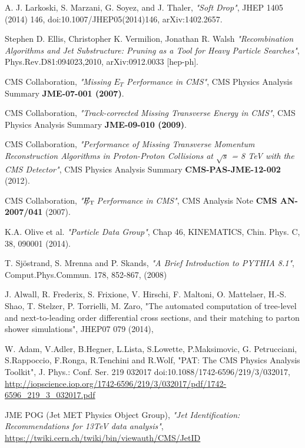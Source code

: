\documentclass[a4paper,12pt,oneside]{report}
\begin{document}
\begin{thebibliography}{9}
A. J. Larkoski, S. Marzani, G. Soyez, and J. Thaler,
\emph{"Soft Drop"},
JHEP 1405 (2014) 146, doi:10.1007/JHEP05(2014)146, arXiv:1402.2657.

Stephen D. Ellis, Christopher K. Vermilion, Jonathan R. Walsh
\emph{"Recombination Algorithms and Jet Substructure: Pruning as a Tool for Heavy Particle Searches"},
Phys.Rev.D81:094023,2010, arXiv:0912.0033 [hep-ph].

CMS Collaboration,
\emph{"Missing $E_{T}$ Performance in CMS"},
CMS Physics Analysis Summary 
\textbf{JME-07-001 (2007)}.

CMS Collaboration,
\emph{"Track-corrected Missing Transverse Energy in CMS"},
CMS Physics Analysis Summary 
\textbf{JME-09-010 (2009)}.

CMS Collaboration,
\emph{"Performance of Missing Transverse Momentum
Reconstruction Algorithms in Proton-Proton Collisions at $\sqrt{s}$ = 8 TeV with the CMS Detector"},
CMS Physics Analysis Summary 
\textbf{CMS-PAS-JME-12-002 } (2012).

CMS Collaboration,
\emph{"$E_{\mathrm{T}}\hspace{-1.1em}/\kern0.45em$ Performance in CMS"},
CMS Analysis Note 
\textbf{CMS AN-2007/041} (2007).

K.A. Olive et al.
\emph{"Particle Data Group"},
Chap 46, KINEMATICS,
Chin. Phys. C, 38, 090001 (2014).

T. Sjöstrand, S. Mrenna and P. Skands,
\emph{"A Brief Introduction to PYTHIA 8.1"},
Comput.Phys.Commun. 178, 852-867, (2008) 

J. Alwall, R. Frederix, S. Frixione, V. Hirschi, F. Maltoni, O. Mattelaer, H.-S. Shao, T. Stelzer, P. Torrielli, M. Zaro,
"The automated computation of tree-level and next-to-leading order differential cross sections, and their matching to parton shower simulations",
JHEP07 079 (2014),

W. Adam, V.Adler, B.Hegner, L.Lista, S.Lowette, P.Maksimovic, G. Petrucciani, S.Rappoccio, F.Ronga, R.Tenchini and R.Wolf,
"PAT: The CMS Physics Analysis Toolkit",
J. Phys.: Conf. Ser. 219 032017 doi:10.1088/1742-6596/219/3/032017,
\url{http://iopscience.iop.org/1742-6596/219/3/032017/pdf/1742-6596_219_3_032017.pdf}

JME POG (Jet MET Physics Object Group),
\emph{"Jet Identification: Recommendations for 13TeV data analysis"},   
\url{https://twiki.cern.ch/twiki/bin/viewauth/CMS/JetID}   


\end{thebibliography}
\end{document}
